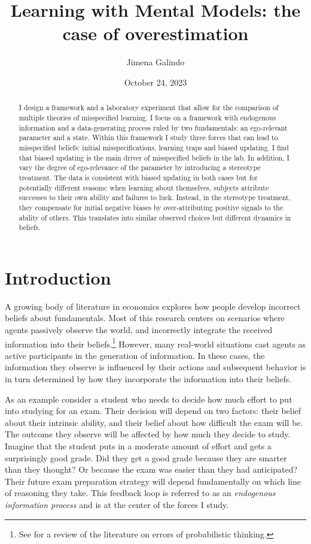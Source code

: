 \documentclass[
  12pt,
]{article}
\title{Learning with Mental Models: the case of overestimation}
\author{Jimena Galindo}
\date{October 24, 2023}
\begin{document}
\maketitle
\begin{abstract}
I design a framework and a laboratory experiment that allow for the
comparison of multiple theories of misspecified learning. I focus on a
framework with endogenous information and a data-generating process
ruled by two fundamentals: an ego-relevant parameter and a state. Within
this framework I study three forces that can lead to misspecified
beliefs: initial misspecifications, learning traps and biased updating.
I find that biased updating is the main driver of misspecified beliefs
in the lab. In addition, I vary the degree of ego-relevance of the
parameter by introducing a stereotype treatment. The data is consistent
with biased updating in both cases but for potentially different
reasons: when learning about themselves, subjects attribute successes to
their own ability and failures to luck. Instead, in the stereotype
treatment, they compensate for initial negative biases by
over-attributing positive signals to the ability of others. This
translates into similar observed choices but different dynamics in
beliefs.
\end{abstract}

\newpage

\hypertarget{introduction}{%
\section{Introduction}\label{introduction}}

A growing body of literature in economics explores how people develop
incorrect beliefs about fundamentals. Most of this research centers on
scenarios where agents passively observe the world, and incorrectly
integrate the received information into their
beliefs.\footnote{See \citet{benjamin2019} for a review of the literature on errors of 
probabilistic thinking.} However, many real-world situations cast agents
as active participants in the generation of information. In these cases,
the information they observe is influenced by their actions and
subsequent behavior is in turn determined by how they incorporate the
information into their beliefs.

As an example consider a student who needs to decide how much effort to
put into studying for an exam. Their decision will depend on two
factors: their belief about their intrinsic ability, and their belief
about how difficult the exam will be. The outcome they observe will be
affected by how much they decide to study. Imagine that the student puts
in a moderate amount of effort and gets a surprisingly good grade. Did
they get a good grade because they are smarter than they thought? Or
because the exam was easier than they had anticipated? Their future exam
preparation strategy will depend fundamentally on which line of
reasoning they take. This feedback loop is referred to as an
\emph{endogenous information 
process} and is at the center of the forces I study.
\end{document}

